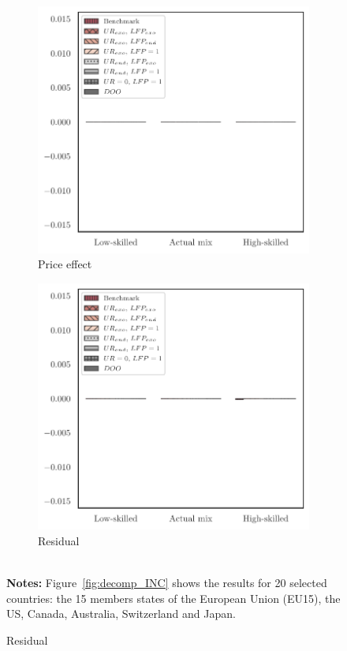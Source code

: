 \documentclass[a4paper,12pt]{article}
\begin{document}
\begin{landscape}
\begin{center}
\begin{figure}[htb!]
\begin{subfigure}{.3\linewidth}
\end{subfigure}%
\hfill
\begin{subfigure}{.3\linewidth}
  \centering
  \caption{Price effect} \label{fig:decomp_mean_PINC}
  \includegraphics[width=\linewidth]{graphs/qPINC.pdf}
\end{subfigure}
\hfill
\begin{subfigure}{.3\linewidth}
  \centering
  \caption{Residual} \label{fig:decomp_mean_ResnINC}
  \includegraphics[width=\linewidth]{graphs/qResnINC.pdf}
\end{subfigure}
\\[0.5cm]
{\footnotesize \textbf{Notes:} Figure~\ref{fig:decomp_INC} shows the results for 20 selected countries:
the 15 members states of the European Union (EU15), the US, Canada,
Australia, Switzerland and Japan.}
\end{figure}
\end{center}
\end{landscape}
\restoregeometry
\end{document}

